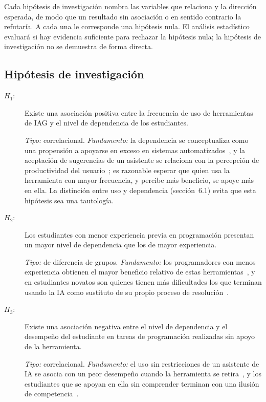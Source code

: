\documentclass[12pt,letterpaper]{article}
\numberwithin{table}{section}
\numberwithin{figure}{section}
\begin{document}
Cada hipótesis de investigación nombra las variables que relaciona y la dirección esperada, de modo que un resultado sin asociación o en sentido contrario la refutaría. A cada una le corresponde una hipótesis nula. El análisis estadístico evaluará si hay evidencia suficiente para rechazar la hipótesis nula; la hipótesis de investigación no se demuestra de forma directa.

\subsection{Hipótesis de investigación}

\begin{description}
  \item[$H_1$:] Existe una asociación positiva entre la frecuencia de uso de herramientas de IAG y el nivel de dependencia de los estudiantes.

  \emph{Tipo:} correlacional. \emph{Fundamento:} la dependencia se conceptualiza como una propensión a apoyarse en exceso en sistemas automatizados~\cite{moralesgarcia2024development}, y la aceptación de sugerencias de un asistente se relaciona con la percepción de productividad del usuario~\cite{ziegler2024measuring}; es razonable esperar que quien usa la herramienta con mayor frecuencia, y percibe más beneficio, se apoye más en ella. La distinción entre uso y dependencia (sección~6.1) evita que esta hipótesis sea una tautología.

  \item[$H_2$:] Los estudiantes con menor experiencia previa en programación presentan un mayor nivel de dependencia que los de mayor experiencia.

  \emph{Tipo:} de diferencia de grupos. \emph{Fundamento:} los programadores con menos experiencia obtienen el mayor beneficio relativo de estas herramientas~\cite{peng2023impact}, y en estudiantes novatos son quienes tienen más dificultades los que terminan usando la IA como sustituto de su propio proceso de resolución~\cite{prather2024widening}.

  \item[$H_3$:] Existe una asociación negativa entre el nivel de dependencia y el desempeño del estudiante en tareas de programación realizadas sin apoyo de la herramienta.

  \emph{Tipo:} correlacional. \emph{Fundamento:} el uso sin restricciones de un asistente de IA se asocia con un peor desempeño cuando la herramienta se retira~\cite{bastani2025generative}, y los estudiantes que se apoyan en ella sin comprender terminan con una ilusión de competencia~\cite{prather2024widening}.


\end{description}
\end{document}

